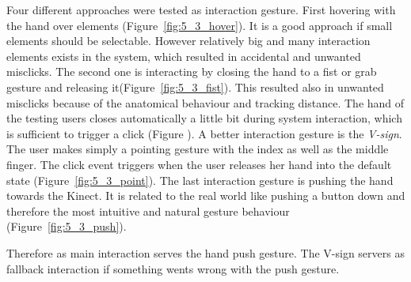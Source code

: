 Four different approaches were tested as interaction gesture. First hovering with the hand over elements (Figure~\ref{fig:5_3_hover}). It is a good approach if small elements should be selectable. However relatively big and many interaction elements exists in the system, which resulted in accidental and unwanted misclicks.
The second one is interacting by closing the hand to a fist or grab gesture and releasing it(Figure~\ref{fig:5_3_fist}). This resulted also in unwanted misclicks because of the anatomical behaviour and tracking distance. The hand of the testing users closes automatically a little bit during system interaction, which is sufficient to trigger a click (Figure ).
A better interaction gesture is the \textit{V-sign}. The user makes simply a pointing gesture with the index as well as the middle finger. The click event triggers when the user releases her hand into the default state (Figure~\ref{fig:5_3_point}). The last interaction gesture is pushing the hand towards the Kinect. It is related to the real world like pushing a button down and therefore the most intuitive and natural gesture behaviour (Figure~\ref{fig:5_3_push}). %

Therefore as main interaction serves the hand push gesture. The V-sign servers as fallback interaction if something wents wrong with the push gesture.

